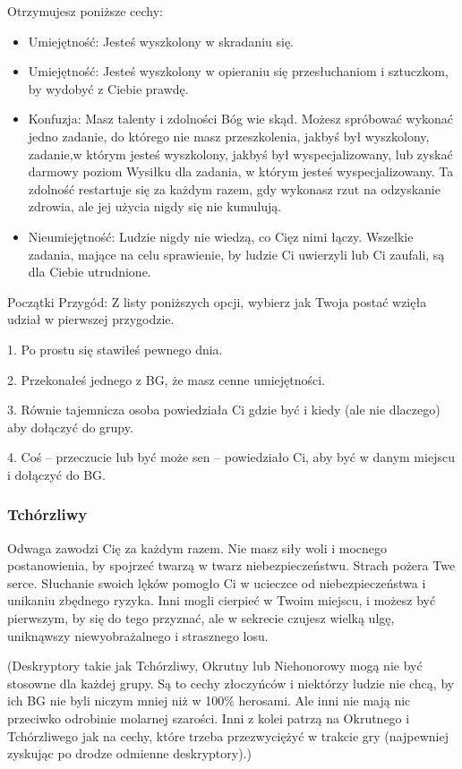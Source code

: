 Otrzymujesz poniższe cechy:
\begin{itemize}
    \item  Umiejętność: Jesteś wyszkolony w skradaniu się.
    \item  Umiejętność: Jesteś wyszkolony w opieraniu się przesłuchaniom i sztuczkom, by wydobyć z Ciebie prawdę.
    \item  Konfuzja: Masz talenty i zdolności Bóg wie skąd. Możesz spróbować wykonać jedno zadanie, do którego nie masz przeszkolenia, jakbyś był wyszkolony, zadanie,w którym jesteś wyszkolony, jakbyś był wyspecjalizowany, lub zyskać darmowy poziom Wysiłku dla zadania, w którym jesteś wyspecjalizowany. Ta zdolność restartuje się za każdym razem, gdy wykonasz rzut na odzyskanie zdrowia, ale jej użycia nigdy się nie kumulują.
    \item  Nieumiejętność: Ludzie nigdy nie wiedzą, co Cięz nimi łączy. Wszelkie zadania, mające na celu sprawienie, by ludzie Ci uwierzyli lub Ci zaufali, są dla Ciebie utrudnione.
\end{itemize}

Początki Przygód: Z listy poniższych opcji, wybierz jak Twoja postać wzięła udział w pierwszej przygodzie.

1. Po prostu się stawiłeś pewnego dnia.

2. Przekonałeś jednego z BG, że masz cenne umiejętności.

3. Równie tajemnicza osoba powiedziała Ci gdzie być i kiedy (ale nie dlaczego) aby dołączyć do grupy.

4. Coś – przeczucie lub być może sen – powiedziało Ci, aby być w danym miejscu i dołączyć do BG.

\subsubsection{Tchórzliwy}

Odwaga zawodzi Cię za każdym razem. Nie masz siły woli i mocnego postanowienia, by spojrzeć twarzą w twarz niebezpieczeństwu. Strach pożera Twe serce. Słuchanie swoich lęków pomogło Ci w ucieczce od niebezpieczeństwa i unikaniu zbędnego ryzyka. Inni mogli cierpieć w Twoim miejscu, i możesz być pierwszym, by się do tego przyznać, ale w sekrecie czujesz wielką ulgę, uniknąwszy niewyobrażalnego i strasznego losu.

(Deskryptory takie jak Tchórzliwy, Okrutny lub Niehonorowy mogą nie być stosowne dla każdej grupy. Są to cechy złoczyńców i niektórzy ludzie nie chcą, by ich BG nie byli niczym mniej niż w 100\% herosami. Ale inni nie mają nic przeciwko odrobinie molarnej szarości. Inni z kolei patrzą na Okrutnego i Tchórzliwego jak na cechy, które trzeba przezwyciężyć w trakcie gry (najpewniej zyskując po drodze odmienne deskryptory).)

